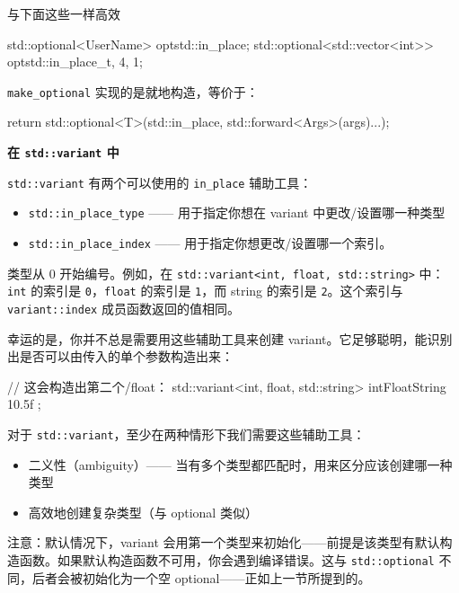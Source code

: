 与下面这些一样高效

\begin{codebox}[cpp]
std::optional<UserName> opt{std::in_place};
std::optional<std::vector<int>> opt{std::in_place_t, 4, 1};
\end{codebox}

\texttt{make\_optional} 实现的是就地构造，等价于：

\begin{codebox}[cpp]
return std::optional<T>(std::in_place, std::forward<Args>(args)...);
\end{codebox}

\textbf{在 \texttt{std::variant} 中}

\texttt{std::variant} 有两个可以使用的 \texttt{in\_place} 辅助工具：

\begin{itemize}
\item \texttt{std::in\_place\_type} —— 用于指定你想在 variant 中更改/设置哪一种类型
\item \texttt{std::in\_place\_index} —— 用于指定你想更改/设置哪一个索引。
\end{itemize}

类型从 0 开始编号。例如，在 \texttt{std::variant<int, float, std::string>} 中：\texttt{int} 的索引是 \texttt{0}，\texttt{float} 的索引是 \texttt{1}，而 string 的索引是 \texttt{2}。这个索引与 \texttt{variant::index} 成员函数返回的值相同。

幸运的是，你并不总是需要用这些辅助工具来创建 variant。它足够聪明，能识别出是否可以由传入的单个参数构造出来：

\begin{codebox}[cpp]
// 这会构造出第二个/float：
std::variant<int, float, std::string> intFloatString { 10.5f };
\end{codebox}

对于 \texttt{std::variant}，至少在两种情形下我们需要这些辅助工具：

\begin{itemize}
\item 二义性（ambiguity）—— 当有多个类型都匹配时，用来区分应该创建哪一种类型
\item 高效地创建复杂类型（与 optional 类似）
\end{itemize}

注意：默认情况下，variant 会用第一个类型来初始化——前提是该类型有默认构造函数。如果默认构造函数不可用，你会遇到编译错误。这与 \texttt{std::optional} 不同，后者会被初始化为一个空 optional——正如上一节所提到的。

